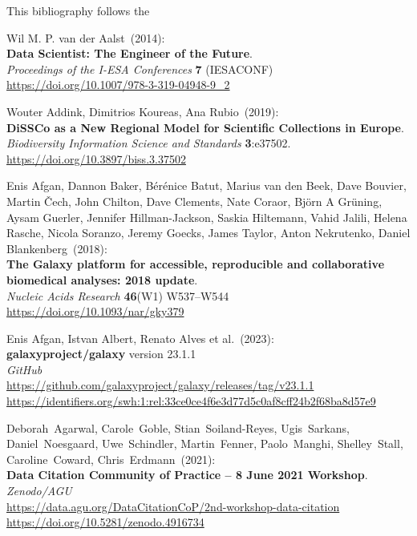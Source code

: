 
\makeatletter
{}

\begin{thebibliography}{9}

This bibliography follows the     

\small

Wil M. P. van der Aalst~(2014):\\
\textbf{Data Scientist: The Engineer of the Future}.\\
\emph{Proceedings of the I-ESA Conferences} \textbf{7} (IESACONF) \\
\url{https://doi.org/10.1007/978-3-319-04948-9_2}

Wouter Addink, Dimitrios Koureas, Ana Rubio~(2019): \\
\textbf{DiSSCo as a New Regional Model for Scientific Collections in Europe}.\\
\emph{Biodiversity Information Science and Standards}
\textbf{3}:e37502.\\
\url{https://doi.org/10.3897/biss.3.37502}

Enis Afgan, Dannon Baker, Bérénice Batut, Marius van
den Beek, Dave Bouvier, Martin Čech, John Chilton, Dave Clements, Nate
Coraor, Björn A Grüning, Aysam Guerler, Jennifer Hillman-Jackson, Saskia
Hiltemann, Vahid Jalili, Helena Rasche, Nicola Soranzo, Jeremy Goecks,
James Taylor, Anton Nekrutenko, Daniel Blankenberg~(2018): \\
\textbf{The Galaxy platform for accessible, reproducible and
collaborative biomedical analyses: 2018 update}.\\
\emph{Nucleic Acids Research} \textbf{46}(W1) W537--W544\\
\url{https://doi.org/10.1093/nar/gky379}

Enis Afgan, Istvan Albert, Renato Alves et al.~(2023): \\
\textbf{galaxyproject/galaxy} version 23.1.1\\
\emph{GitHub}\\
\url{https://github.com/galaxyproject/galaxy/releases/tag/v23.1.1}\\
\url{https://identifiers.org/swh:1:rel:33ce0ce4f6e3d77d5c0af8cff24b2f68ba8d57e9}

Deborah~Agarwal, Carole~Goble, Stian~Soiland-Reyes,
Ugis~Sarkans, Daniel~Noesgaard, Uwe~Schindler, Martin~Fenner,
Paolo~Manghi, Shelley~Stall, Caroline~Coward, Chris~Erdmann~(2021): \\
\textbf{Data Citation Community of Practice -- 8 June 2021 Workshop}.\\
\emph{Zenodo/AGU}\\
\url{https://data.agu.org/DataCitationCoP/2nd-workshop-data-citation}\\
\url{https://doi.org/10.5281/zenodo.4916734}


\end{thebibliography}
